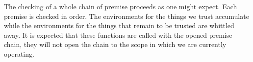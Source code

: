 The checking of a whole chain of premise proceeds as one might expect.
Each premise is checked in order. The environments for the things we trust
accumulate while the environments for the things that remain to be trusted
are whittled away. It is expected that these functions are called with
the opened premise chain, they will not open the chain to the scope in
which we are currently operating.

\begin{code}%
\>[0]\AgdaSpace{}%
\AgdaSymbol{:}%
\>[293I]\AgdaSpace{}%
%
\>[28]\<%
\\
\>[.][@{}l@{}]\<[293I]%
\>[16]%
\>[28]\<%
\\
%
\>[16]\AgdaSpace{}%
%
\>[28]\<%
\\
%
\>[16]\AgdaSpace{}%
%
\>[28]\<%
\\
%
\>[16]\AgdaSpace{}%
\AgdaSpace{}%
\AgdaSpace{}%
\AgdaSpace{}%
\AgdaSpace{}%
%
\>[34]\<%
\\
%
\>[16]\AgdaSpace{}%
\AgdaSymbol{(}\AgdaSpace{}%
\AgdaSpace{}%
\AgdaSpace{}%
\AgdaSpace{}%
\AgdaSymbol{)}\<%
\\
\>[0]\<%
\\
\>[0]\AgdaSpace{}%
\AgdaSpace{}%
\AgdaSpace{}%
\AgdaSpace{}%
\AgdaSpace{}%
\AgdaSymbol{(}\AgdaSpace{}%
\AgdaSpace{}%
\AgdaSpace{}%
\AgdaOperator{\AgdaInductiveConstructor{[}}\AgdaSpace{}%
\AgdaSpace{}%
\AgdaOperator{\AgdaInductiveConstructor{]}}\AgdaSymbol{)}\<%
\\
\>[0][@{}l@{\AgdaIndent{0}}]%
\>[2]\AgdaSymbol{=}%
\>[317I]\<%
\\
\>[.][@{}l@{}]\<[317I]%
\>[4]\AgdaSymbol{\AgdaUnderscore{}}\AgdaSpace{}%
\AgdaSpace{}%
\AgdaSpace{}%
\AgdaSpace{}%
\AgdaSpace{}%
\AgdaSymbol{(}\AgdaSpace{}%

\end{code}
